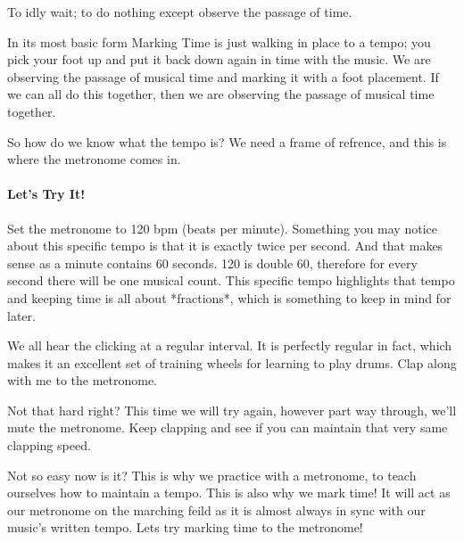 \documentclass[12pt,letterpaper]{book}
\begin{document}
To idly wait; to do nothing except observe the passage of time.

In its most basic form Marking Time is just walking in place to a tempo; you pick your foot up and put it back down again in time with the music.  We are observing the passage of musical time and marking it with a foot placement.  If we can all do this together, then we are observing the passage of musical time together.  

So how do we know what the tempo is?  We need a frame of refrence, and this is where the metronome comes in.

\paragraph{Let's Try It!}

Set the metronome to 120 bpm (beats per minute).  Something you may notice about this specific tempo is that it is exactly twice per second.  And that makes sense as a minute contains 60 seconds.  120 is double 60, therefore for every second there will be one musical count.  This specific tempo highlights that tempo and keeping time is all about *fractions*, which is something to keep in mind for later.

We all hear the clicking at a regular interval.  It is perfectly regular in fact, which makes it an excellent set of training wheels for learning to play drums.  Clap along with me to the metronome.


Not that hard right?  This time we will try again, however part way through, we'll mute the metronome.  Keep clapping and see if you can maintain that very same clapping speed.  


Not so easy now is it?  This is why we practice with a metronome, to teach ourselves how to maintain a tempo.  This is also why we mark time!  It will act as our metronome on the marching feild as it is almost always in sync with our music's written tempo.  Lets try marking time to the metronome!

\end{document}
